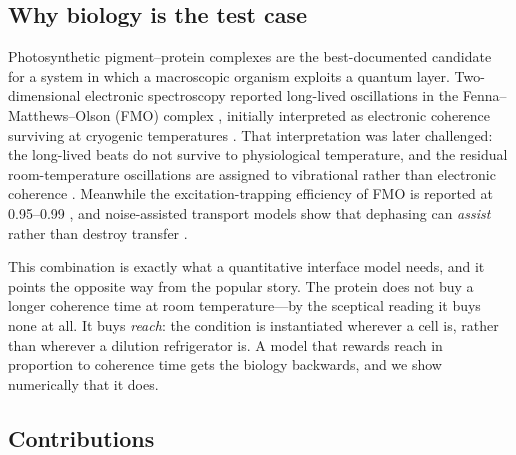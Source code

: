 \documentclass[conference]{IEEEtran}
\theoremstyle{definition}
\begin{document}
\subsection{Why biology is the test case}

Photosynthetic pigment--protein complexes are the best-documented candidate for a
system in which a macroscopic organism exploits a quantum layer. Two-dimensional
electronic spectroscopy reported long-lived oscillations in the Fenna--Matthews--Olson
(FMO) complex \cite{engel2007,brixner2005}, initially interpreted as electronic
coherence surviving at cryogenic temperatures
\cite{panitchayangkoon2010}. That interpretation was later challenged: the
long-lived beats do not survive to physiological temperature, and the residual
room-temperature oscillations are assigned to vibrational rather than electronic
coherence \cite{duan2017}. Meanwhile the excitation-trapping efficiency of FMO is
reported at \num{0.95}--\num{0.99} \cite{adolphs2006}, and noise-assisted transport
models show that dephasing can \emph{assist} rather than destroy transfer
\cite{mohseni2008,plenio2008,lambert2013,romero2017}.

This combination is exactly what a quantitative interface model needs, and it
points the opposite way from the popular story. The protein does not buy a longer
coherence time at room temperature---by the sceptical reading it buys none at all.
It buys \emph{reach}: the condition is instantiated wherever a cell is, rather
than wherever a dilution refrigerator is. A model that rewards reach in proportion
to coherence time gets the biology backwards, and we show numerically that it does.

\subsection{Contributions}
\end{document}
